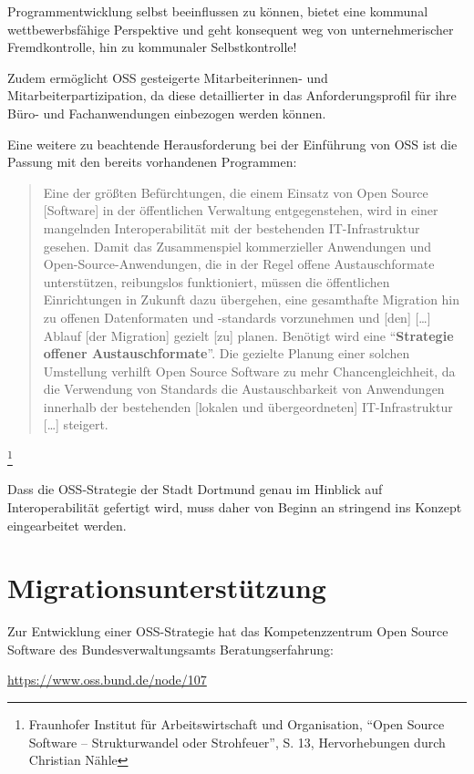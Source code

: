 \documentclass[a4paper]{scrartcl}
\begin{document}
Programmentwicklung selbst beeinflussen zu können, bietet eine kommunal
wettbewerbsfähige Perspektive und geht konsequent weg von unternehmerischer
Fremdkontrolle, hin zu kommunaler Selbstkontrolle!

Zudem ermöglicht OSS gesteigerte Mitarbeiterinnen- und Mitarbeiterpartizipation,
da diese detaillierter in das Anforderungsprofil für ihre Büro- und
Fachanwendungen einbezogen werden können.

Eine weitere zu beachtende Herausforderung bei der Einführung von OSS ist die
Passung mit den bereits vorhandenen Programmen: \begin{quote}Eine der größten
  Befürchtungen, die einem Einsatz von Open Source [Software] in der
  öffentlichen Verwaltung entgegenstehen, wird in einer mangelnden
  Interoperabilität mit der bestehenden IT-Infrastruktur gesehen. Damit das
  Zusammenspiel kommerzieller Anwendungen und Open-Source-Anwendungen, die in
  der Regel offene Austauschformate unterstützen, reibungslos funktioniert,
  müssen die öffentlichen Einrichtungen in Zukunft dazu übergehen, eine
  gesamthafte Migration hin zu offenen Datenformaten und {}-standards
  vorzunehmen und [den] [\ldots] Ablauf [der Migration] gezielt [zu]
  planen. Benötigt wird eine ``\textbf{Strategie offener
    Austauschformate}''. Die gezielte Planung einer solchen Umstellung verhilft
  Open Source Software zu mehr Chancengleichheit, da die Verwendung von
  Standards die Austauschbarkeit von Anwendungen innerhalb der bestehenden
  [lokalen und übergeordneten] IT-Infrastruktur [\ldots]
  steigert.\end{quote}\footnote{Fraunhofer Institut für Arbeitswirtschaft und
  Organisation, ``Open Source Software -- Strukturwandel oder Strohfeuer'',
  S. 13, Hervorhebungen durch Christian Nähle}

Dass die OSS-Strategie der Stadt Dortmund genau im Hinblick auf
Interoperabilität gefertigt wird, muss daher von Beginn an stringend ins Konzept
eingearbeitet werden.

\section{Migrationsunterstützung}

Zur Entwicklung einer OSS-Strategie hat das Kompetenzzentrum Open Source
Software des Bundesverwaltungsamts Beratungserfahrung:

{\centering
\href{https://www.oss.bund.de/node/107}{https://www.oss.bund.de/node/107}
}
\end{document}
